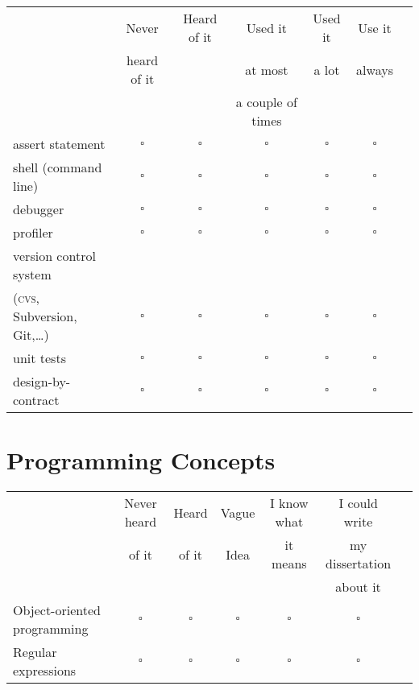 \documentclass[article,twoside]{memoir}
\newcommand*{\bigO}{\mathcal{O}}
\newcommand*{\checkbox}{$\square$}
\def\th#1{#1}
\begin{document}
\begin{tabular}{lcccccc}
 \toprule
 & \th{Never}       & \th{Heard of it} & \th{Used it}           & \th{Used it} & \th{Use it}\\
 & \th{heard of it} & \th{}            & \th{at most}           & \th{a lot}   & \th{always}\\
 & \th{}            & \th{}            & \th{a couple of times} & \th{}        & \th{}\\
 \midrule
assert statement           &\checkbox &\checkbox &\checkbox &\checkbox &\checkbox \\
shell (command line)       &\checkbox &\checkbox &\checkbox &\checkbox &\checkbox \\
debugger                   &\checkbox &\checkbox &\checkbox &\checkbox &\checkbox \\
profiler                   &\checkbox &\checkbox &\checkbox &\checkbox &\checkbox \\
version control system \\
(\textsc{cvs}, 
Subversion, Git,\dots)     &\checkbox &\checkbox &\checkbox &\checkbox &\checkbox \\
unit tests                 &\checkbox &\checkbox &\checkbox &\checkbox &\checkbox \\
design-by-contract         &\checkbox &\checkbox &\checkbox &\checkbox &\checkbox \\
\end{tabular}

\section{Programming Concepts}
\begin{tabular}{lcccccc}
 \toprule
 & Never heard  & Heard & Vague & I know what & I could write    \\
 & of it        & of it & Idea  & it means    & my dissertation  \\
 &              &       &       &             &    about it      \\
 \midrule
Object-oriented programming            &\checkbox &\checkbox &\checkbox &\checkbox &\checkbox \\
Regular expressions                    &\checkbox &\checkbox &\checkbox &\checkbox &\checkbox \\
\end{tabular}
\end{document}
